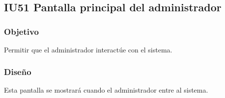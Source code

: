 
\subsection{IU51 Pantalla principal del administrador}

\subsubsection{Objetivo}
	Permitir que el administrador interactúe con el sistema.

\subsubsection{Diseño}
	Esta pantalla se mostrará cuando el administrador entre al sistema.


